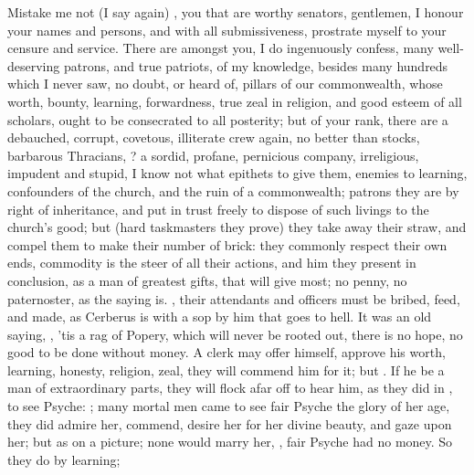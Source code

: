 Mistake me not (I say again) , you that are worthy
senators, gentlemen, I honour your names and persons, and with all
submissiveness, prostrate myself to your censure and service. There are amongst
you, I do ingenuously confess, many well-deserving patrons, and true patriots,
of my knowledge, besides many hundreds which I never saw, no doubt, or heard
of, pillars of our commonwealth, whose worth, bounty,
learning, forwardness, true zeal in religion, and good esteem of all scholars,
ought to be consecrated to all posterity; but of your rank, there are a
debauched, corrupt, covetous, illiterate crew again, no better than stocks,
 barbarous Thracians, ? a
sordid, profane, pernicious company, irreligious, impudent and stupid, I know
not what epithets to give them, enemies to learning, confounders of the church,
and the ruin of a commonwealth; patrons they are by right of inheritance, and
put in trust freely to dispose of such livings to the church's good; but (hard
taskmasters they prove) they take away their straw, and compel them to make
their number of brick: they commonly respect their own ends, commodity is the
steer of all their actions, and him they present in conclusion, as a man of
greatest gifts, that will give most; no penny, no
paternoster, as the saying is. , their attendants and officers must be bribed, feed, and
made, as Cerberus is with a sop by him that goes to hell. It was an old saying,
, 'tis a rag of Popery,
which will never be rooted out, there is no hope, no good to be done without
money. A clerk may offer himself, approve his worth,
learning, honesty, religion, zeal, they will commend him for it; but
. If he be a man of
extraordinary parts, they will flock afar off to hear him, as they did in
\Apuleius, to see Psyche: ; many
mortal men came to see fair Psyche the glory of her age, they did admire her,
commend, desire her for her divine beauty, and gaze upon her; but as on a
picture; none would marry her, , fair Psyche had no money.
So they do by learning;

